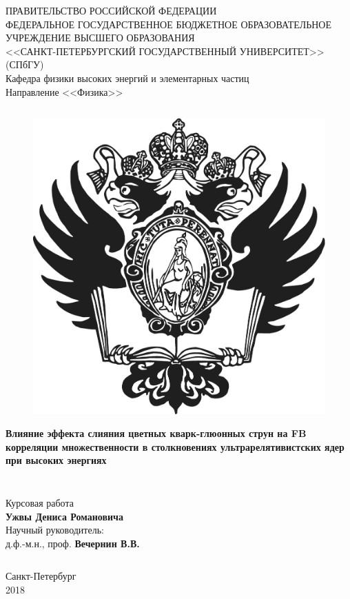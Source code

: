 \begin{center}
\large{ПРАВИТЕЛЬСТВО РОССИЙСКОЙ ФЕДЕРАЦИИ} \\
\vspace{2em}
\large{ФЕДЕРАЛЬНОЕ ГОСУДАРСТВЕННОЕ БЮДЖЕТНОЕ ОБРАЗОВАТЕЛЬНОЕ УЧРЕЖДЕНИЕ ВЫСШЕГО ОБРАЗОВАНИЯ\\
<<САНКТ-ПЕТЕРБУРГСКИЙ ГОСУДАРСТВЕННЫЙ УНИВЕРСИТЕТ>>\\
(СПбГУ)\\}
Кафедра физики высоких энергий и элементарных частиц\\
Направление <<Физика>>
\end{center}
$$$$

\begin{figure}[h!]
\center
\includegraphics[width=.25\textwidth,clip]{Img/eagle2.eps}
\end{figure}

\begin{center}
\large{{\bf Влияние эффекта слияния цветных кварк-глюонных струн на FB корреляции множественности в столкновениях  ультрарелятивистских ядер при высоких энергиях}}
\end{center}
$$$$


$$$$
$$$$
$$$$
$$$$
$$$$
$$$$

\begin{flushright}
Курсовая работа
$$$$
{\bf Ужвы Дениса Романовича} \\
\vspace{2em}
Научный руководитель: \\
д.ф.-м.н., проф. {\bf Вечернин В.В.} \\
\end{flushright}
$$$$

\begin{center}
\Large{
Санкт-Петербург \\
2018}
\end{center}
